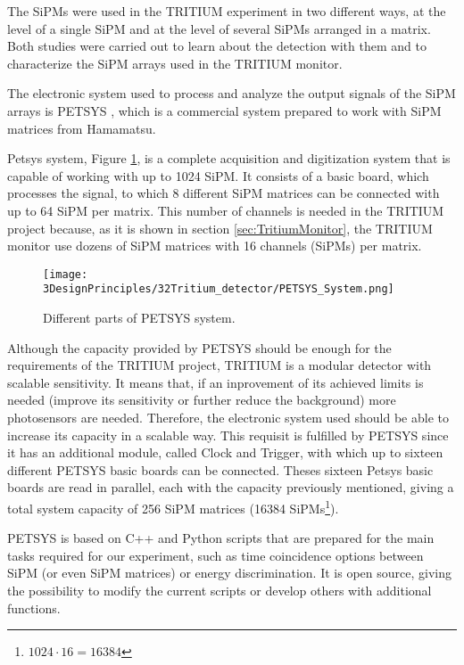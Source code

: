 The SiPMs were used in the TRITIUM experiment in two different ways, at the level of a single SiPM and at the level of several SiPMs arranged in a matrix. Both studies were carried out to learn about the detection with them and to characterize the SiPM arrays used in the TRITIUM monitor.

The electronic system used to process and analyze the output signals of the SiPM arrays is PETSYS \cite{PETSYS}, which is a commercial system prepared to work with SiPM matrices from Hamamatsu.

Petsys system, Figure \ref{fig:PETSYS}, is a complete acquisition and digitization system that is capable of working with up to 1024 SiPM. It consists of a basic board, which processes the signal, to which 8 different SiPM matrices can be connected with up to 64 SiPM per matrix. This number of channels is needed in the TRITIUM project because, as it is shown in section \ref{sec:TritiumMonitor}, the TRITIUM monitor use dozens of SiPM matrices with 16 channels (SiPMs) per matrix.

\begin{figure}[htbp]
\centering
\texttt{[image: 3DesignPrinciples/32Tritium\_detector/PETSYS\_System.png]}
\caption{Different parts of PETSYS system.\label{fig:PETSYS}~\cite{PETSYS}}
\end{figure}

Although the capacity provided by PETSYS should be enough for the requirements of the TRITIUM project, TRITIUM is a modular detector with scalable sensitivity. It means that, if an inprovement of its achieved limits is needed (improve its sensitivity or further reduce the background) more photosensors are needed. Therefore, the electronic system used should be able to increase its capacity in a scalable way. This requisit is fulfilled by PETSYS since it has an additional module, called Clock and Trigger, with which up to sixteen different PETSYS basic boards can be connected. Theses sixteen Petsys basic boards are read in parallel, each with the capacity previously mentioned, giving a total system capacity of 256 SiPM matrices (16384 SiPMs\footnote{$1024\cdot{}16 = 16384$}).

PETSYS is based on C++ and Python scripts that are prepared for the main tasks required for our experiment, such as time coincidence options between SiPM (or even SiPM matrices) or energy discrimination. It is open source, giving the possibility to modify the current scripts or develop others with additional functions. %

